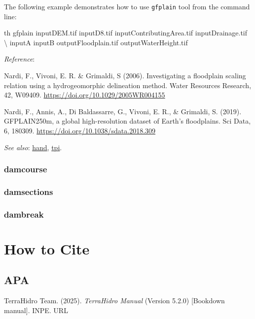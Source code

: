 \documentclass[
]{book}
\newenvironment{Shaded}{\begin{snugshade}}{\end{snugshade}}
\newcommand{\DataTypeTok}[1]{\textcolor[rgb]{0.13,0.29,0.53}{#1}}
\newcommand{\ExtensionTok}[1]{#1}
\newcommand{\NormalTok}[1]{#1}
\begin{document}
The following example demonstrates how to use \texttt{gfplain} tool from the command line:

\begin{Shaded}
\begin{Highlighting}[]
\ExtensionTok{th}\NormalTok{ gfplain inputDEM.tif inputD8.tif inputContributingArea.tif inputDrainage.tif }\DataTypeTok{\textbackslash{}}
\NormalTok{           inputA inputB outputFloodplain.tif outputWaterHeight.tif}
\end{Highlighting}
\end{Shaded}

\emph{Reference}:

Nardi, F., Vivoni, E. R. \& Grimaldi, S (2006). Investigating a floodplain scaling relation using a hydrogeomorphic delineation method. Water Resources Research, 42, W09409. \url{https://doi.org/10.1029/2005WR004155}

Nardi, F., Annis, A., Di Baldassarre, G., Vivoni, E. R., \& Grimaldi, S. (2019). GFPLAIN250m, a global high-resolution dataset of Earth's floodplains. Sci Data, 6, 180309. \url{https://doi.org/10.1038/sdata.2018.309}

\emph{See also}: \hyperref[hand]{hand}, \hyperref[tpi]{tpi}.

\subsection{damcourse}\label{damcourse}

\subsection{damsections}\label{damsections}

\subsection{dambreak}\label{dambreak}

\chapter{How to Cite}\label{how-to-cite}

\section*{APA}\label{apa}

TerraHidro Team. (2025). \emph{TerraHidro Manual} (Version 5.2.0) {[}Bookdown manual{]}. INPE. URL
\end{document}
